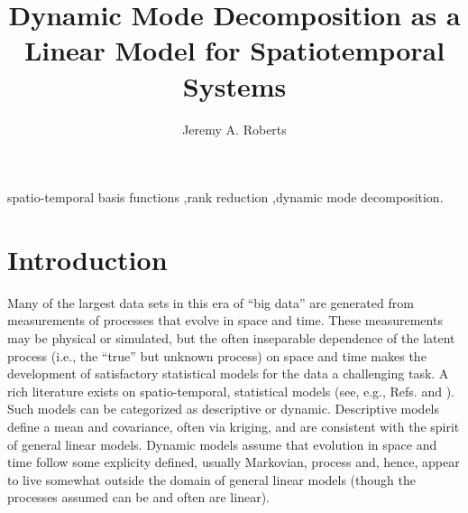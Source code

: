 \documentclass[review,number,sort&compress,12pt]{elsarticle}
\begin{document}
\begin{frontmatter}

\title{Dynamic Mode Decomposition as a Linear Model for Spatiotemporal Systems}

\author{Jeremy A. Roberts}
\address{Department of Statistics, Kansas State University, Manhattan, KS 66506, USA}

\begin{abstract}

\end{abstract}

\begin{keyword}
 spatio-temporal basis functions \sep rank reduction \sep dynamic mode decomposition.
\end{keyword}
\end{frontmatter}

\ifDRAFT
\linenumbers
\fi

\section{Introduction}
\label{sec:introduction}

Many of the largest data sets in this era of ``big data'' are generated from measurements of processes that evolve in space and time.
These measurements may be physical or simulated, but the often inseparable dependence of the latent process (i.e., the ``true'' but unknown process) on space and time makes the development of satisfactory statistical models for the data a challenging task.
A rich literature exists on spatio-temporal, statistical models (see, e.g., Refs. \cite{cressie2011sst} and \cite{wikle2019sts}).
Such models can be categorized as descriptive or dynamic.  
Descriptive models define a mean and covariance, often via kriging, and are consistent with the spirit of general linear models.  
Dynamic models assume that evolution in space and time follow some explicity defined, usually Markovian, process and, hence, appear to live somewhat outside the domain of general linear models (though the processes assumed can be and often are linear).
\end{document}

